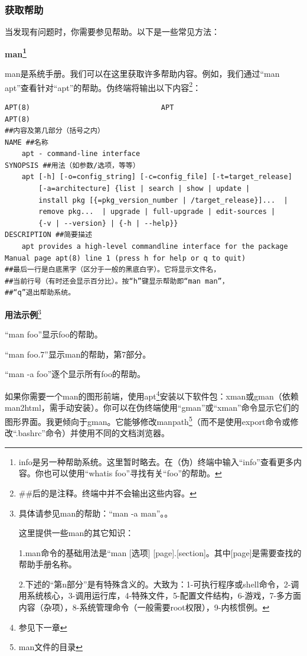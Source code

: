\documentclass{book}
\begin{document}
\subsubsection{获取帮助}
\cite{manman}\par
当发现有问题时，你需要参见帮助。以下是一些常见方法：\par
\Large \textbf{man\footnote{info是另一种帮助系统。这里暂时略去。在（伪）终端中输入“info”查看更多内容。你也可以使用“whatis foo”寻找有关“foo”的帮助。}} \normalsize \par
man是系统手册。我们可以在这里获取许多帮助内容。例如，我们通过“man apt”查看针对“apt”的帮助。伪终端将输出以下内容\footnote{\#\#后的是注释。终端中并不会输出这些内容。}：
\begin{verbatim}
APT(8)                               APT                              APT(8)
##内容及第几部分（括号之内）
NAME ##名称
    apt - command-line interface
SYNOPSIS ##用法（如参数/选项，等等）
    apt [-h] [-o=config_string] [-c=config_file] [-t=target_release]
        [-a=architecture] {list | search | show | update |
        install pkg [{=pkg_version_number | /target_release}]...  |
        remove pkg...  | upgrade | full-upgrade | edit-sources |
        {-v | --version} | {-h | --help}}
DESCRIPTION ##简要描述
    apt provides a high-level commandline interface for the package
Manual page apt(8) line 1 (press h for help or q to quit)
##最后一行是白底黑字（区分于一般的黑底白字）。它将显示文件名，
##当前行号（有时还会显示百分比）。按“h”键显示帮助即“man man”，
##“q”退出帮助系统。
\end{verbatim}
\Large \par\textbf{用法示例}\footnote{具体请参见man的帮助：“man -a man”。。\par 这里提供一些man的其它知识：\par 1.man命令的基础用法是“man [选项] [page].[section]。其中[page]是需要查找的帮助手册名称。\par 2.下述的“第n部分”是有特殊含义的。大致为：1-可执行程序或shell命令，2-调用系统核心，3-调用运行库，4-特殊文件，5-配置文件结构，6-游戏，7-多方面内容（杂项），8-系统管理命令（一般需要root权限），9-内核惯例。} \normalsize \par
“man foo”显示foo的帮助。\par
“man foo.7”显示man的帮助，第7部分。\par
“man -a foo”逐个显示所有foo的帮助。\par
如果你需要一个man的图形前端，使用apt\footnote{参见下一章}安装以下软件包：xman或gman（依赖man2html，需手动安装）。你可以在伪终端使用“gman”或“xman”命令显示它们的图形界面。我更倾向于gman。它能够修改manpath\footnote{man文件的目录}（而不是使用export命令或修改“.bashrc”命令）并使用不同的文档浏览器。\par
\end{document}
